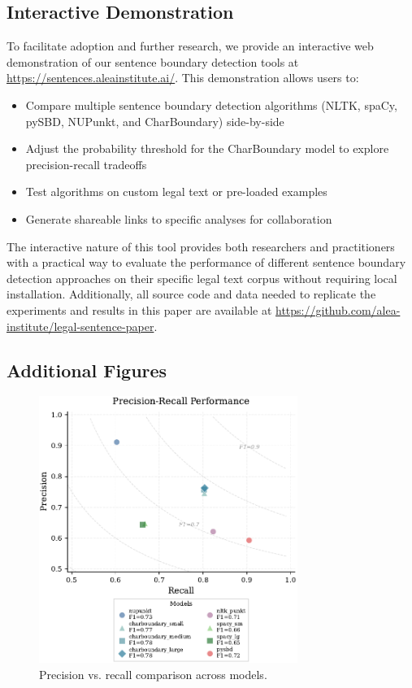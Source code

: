 \subsection{Interactive Demonstration}
\label{appendix:demo}

To facilitate adoption and further research, we provide an interactive web demonstration of our sentence boundary detection tools at \url{https://sentences.aleainstitute.ai/}. This demonstration allows users to:

\begin{itemize}
\item Compare multiple sentence boundary detection algorithms (NLTK, spaCy, pySBD, NUPunkt, and CharBoundary) side-by-side
\item Adjust the probability threshold for the CharBoundary model to explore precision-recall tradeoffs
\item Test algorithms on custom legal text or pre-loaded examples
\item Generate shareable links to specific analyses for collaboration
\end{itemize}

The interactive nature of this tool provides both researchers and practitioners with a practical way to evaluate the performance of different sentence boundary detection approaches on their specific legal text corpus without requiring local installation. Additionally, all source code and data needed to replicate the experiments and results in this paper are available at \url{https://github.com/alea-institute/legal-sentence-paper}.

\subsection{Additional Figures}
\label{appendix:Figures}

\begin{figure}[htbp]
\centering
\includegraphics[width=0.75\textwidth]{figures/precision_recall.pdf}
\caption{Precision vs. recall comparison across models.}
\label{fig:precision_recall_tradeoff}
\end{figure}

